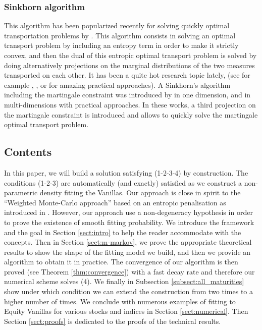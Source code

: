 \documentclass{amsart}%
\theoremstyle{definition}
\theoremstyle{remark}
\begin{document}
\subsubsection{Sinkhorn algorithm} This algorithm \cite{sinkhorn1967concerning} has been popularized recently for solving quickly optimal transportation problems by \cite{cuturi2013sinkhorn}. This algorithm consists in solving an optimal transport problem by including an entropy term in order to make it strictly convex, and then the dual of this entropic optimal transport problem is solved by doing alternatively projections on the marginal distributions of the two measures transported on each other. It has been a quite hot research topic lately, (see for example \cite{peyre2017computational}, \cite{merigot2011multiscale}, or \cite{schmitzer2016stabilized} for amazing practical approaches). A Sinkhorn's algorithm including the martingale constraint was introduced by \cite{guo2017computational} in one dimension, and \cite{de2018entropic} in multi-dimensions with practical approaches. In these works, a third projection on the martingale constraint is introduced and allows to quickly solve the martingale optimal transport problem.


\subsection{Contents} In this paper, we will build a solution satisfying (1-2-3-4) by construction. The conditions (1-2-3) are automatically (and exactly) satisfied as we construct a non-parametric density fitting the Vanillas. Our approach is close in spirit to the ``Weighted Monte-Carlo approach'' based on an entropic penalisation as introduced in \cite{avellaneda2001weighted}. However, our approach use a non-degeneracy hypothesis in order to prove the existence of smooth fitting probability. We introduce the framework and the goal in Section \ref{sect:intro} to help the reader accommodate with the concepts. Then in Section \ref{sect:m-markov}, we prove the appropriate theoretical results to show the shape of the fitting model we build, and then we provide an algorithm to obtain it in practice. The convergence of our algorithm is then proved (see Theorem \ref{thm:convergence}) with a fast decay rate and therefore our numerical scheme solves (4). We finally in Subsection \ref{subsect:all_maturities} show under which condition we can extend the construction from two times to a higher number of times. We conclude with numerous examples of fitting to Equity Vanillas for various stocks and indices in Section \ref{sect:numerical}. Then Section \ref{sect:proofs} is dedicated to the proofs of the technical results.
\end{document}
